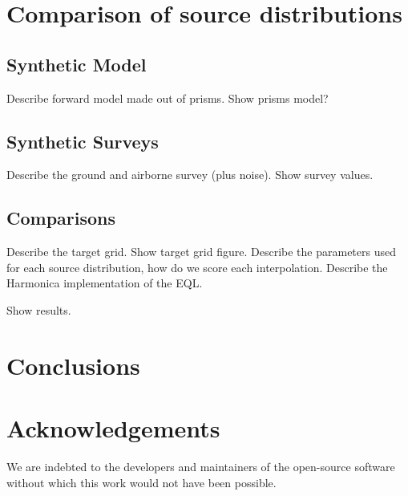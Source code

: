 \documentclass[twocolumn]{article}
\begin{document}

\section{Comparison of source distributions}

\subsection{Synthetic Model}

Describe forward model made out of prisms.
Show prisms model?

\subsection{Synthetic Surveys}

Describe the ground and airborne survey (plus noise).
Show survey values.

\subsection{Comparisons}

Describe the target grid. Show target grid figure.
Describe the parameters used for each source distribution, how do we score each interpolation.
Describe the Harmonica implementation of the EQL.

Show results.


\section{Conclusions}


\section{Acknowledgements}

We are indebted to the developers and maintainers of the open-source software without
which this work would not have been possible.




\end{document}
